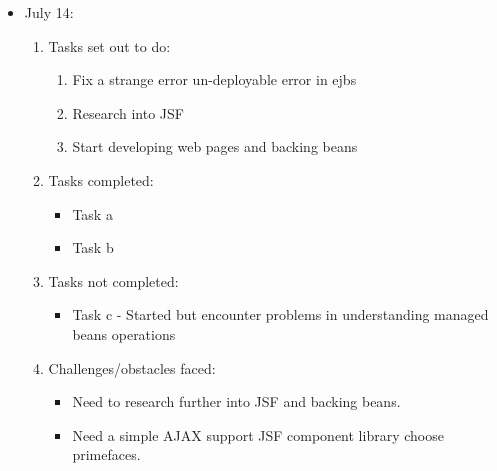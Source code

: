 	\begin{itemize}
		\item July 14:
		\begin{enumerate}
			\item Tasks set out to do:
			\begin{enumerate}
				\item Fix a strange error un-deployable error in ejbs
				\item Research into JSF
				\item Start developing web pages and backing beans				
			\end{enumerate}
			\item Tasks completed:
			\begin{itemize}
				\item Task a
				\item Task b								
			\end{itemize}
			\item Tasks not completed:
			\begin{itemize}
				\item Task c - Started but encounter problems in understanding managed beans operations
			\end{itemize}
			\item Challenges/obstacles faced:
			\begin{itemize}
				\item Need to research further into JSF and backing beans.
				\item Need a simple AJAX support JSF component library choose primefaces.
			\end{itemize}			
		\end{enumerate}
	\end{itemize}
